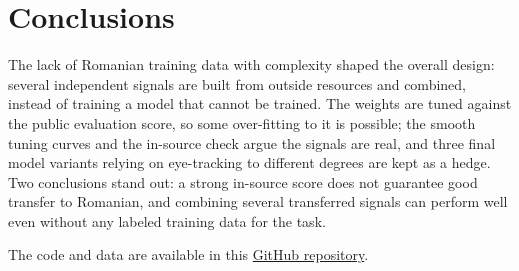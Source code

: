 \documentclass[11pt]{article}
\begin{document}
\section{Conclusions}
\label{section:conclusions}
The lack of Romanian training data with complexity shaped the overall design: several independent signals are
built from outside resources and combined, instead of training a model that cannot be trained. The weights are
tuned against the public evaluation score, so some over-fitting to it is possible; the smooth tuning curves and the
in-source check argue the signals are real, and three final model variants relying on eye-tracking to different
degrees are kept as a hedge. Two conclusions stand out: a strong in-source score does not guarantee good transfer
to Romanian, and combining several transferred signals can perform well even without any labeled training data for
the task.

The code and data are available in this
\href{https://github.com/curs-ia-2026/ia-sahistii}{GitHub repository}.



\end{document}
